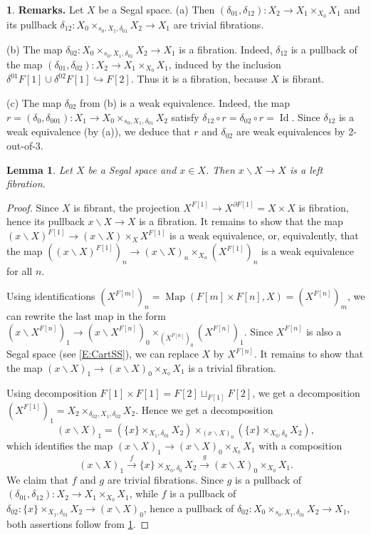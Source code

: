 \documentclass[12pt]{amsart}
\theoremstyle{plain}
\newtheorem{Lem}[Thm]{Lemma}
\theoremstyle{definition}
\newtheorem{Emp}[Thm]{}
\numberwithin{equation}{section}
\newcommand{\lra}{\longrightarrow}
\newcommand{\hra}{\hookrightarrow}
\newcommand{\dt}{\delta}
\newcommand{\bs}{\backslash}
\newcommand{\re}[1]{\ref{E:#1}}
\newcommand{\Map}{\operatorname{Map}}
\newcommand{\p}{\partial}
\newcommand{\Id}{\operatorname{Id}}
\begin{document}
\begin{Emp} \label{E:remss}
{\bf Remarks.} Let $X$ be a Segal space. (a) Then
$(\dt_{01},\dt_{12}):X_2\to X_1\times_{X_0}X_1$ and its pullback
$\dt_{12}:X_0\times_{s_0,X_1,\dt_{01}}X_2\to X_1$ are trivial
fibrations.

(b) The map $\dt_{02}:X_0\times_{s_0,X_1,\dt_{01}}X_2\to X_1$ is a
fibration. Indeed, $\dt_{12}$ is a pullback of the map
$(\dt_{01},\dt_{02}):X_2\to X_1\times_{X_0}X_1$, induced by the
inclusion $\dt^{01}F[1]\cup\dt^{02}F[1]\hra F[2]$. Thus it is a
fibration, because $X$ is fibrant.

(c) The map $\dt_{02}$ from (b) is a weak equivalence. Indeed, the
map $r=(\dt_0,\dt_{001}):X_1\to X_0\times_{s_0,X_1,\dt_{01}}X_2$
satisfy $\dt_{12}\circ r=\dt_{02}\circ r=\Id$. Since $\dt_{12}$ is
a weak equivalence (by (a)), we deduce that $r$ and $\dt_{02}$ are
weak equivalences by 2-out-of-3.
\end{Emp}



\begin{Lem} \label{L:undcat}
Let $X$ be a Segal space and $x\in X$. Then $x\bs X\to X$ is a
left fibration.
\end{Lem}

\begin{proof}
Since $X$ is fibrant, the projection $X^{F[1]}\to X^{\p
F[1]}=X\times X$ is fibration, hence its pullback $x\bs X\to X$ is
a fibration. It remains to show that the map $(x\bs X)^{F[1]}\to
(x\bs X)\times_X X^{F[1]}$ is a weak equivalence, or,
equivalently, that the map
 $((x\bs X)^{F[1]})_n\to
(x\bs X)_n\times_{X_n} (X^{F[1]})_n$ is a weak equivalence for all
$n$.

Using identifications $(X^{F[m]})_n=\Map(F[m]\times
F[n],X)=(X^{F[n]})_m$, we can rewrite the last map in the form
$(x\bs X^{F[n]})_1\to (x\bs X^{F[n]})_0\times_{(X^{F[n]})_0}
(X^{F[n]})_1$. Since $X^{F[n]}$ is also a Segal space (see
\re{CartSS}), we can replace $X$ by $X^{F[n]}$. It remains to show
that the map $(x\bs X)_1\to(x\bs X)_0\times_{X_0} X_1$ is a
trivial fibration.

Using decomposition $F[1]\times F[1]=F[2]\sqcup_{F[1]} F[2]$, we
get a decomposition
$(X^{F[1]})_1=X_2\times_{\dt_{02},X_1,\dt_{02}}X_2$. Hence we get
a decomposition
%
\begin{equation} \label{Eq:decomp}
(x\bs X)_1=(\{x\}\times_{X_1,\dt_{01}}X_2)\times_{(x\bs
X)_0}(\{x\}\times_{X_0,\dt_0}X_2),
\end{equation}
%
which identifies the map $(x\bs X)_1\to(x\bs X)_0\times_{X_0} X_1$
with a composition
\[
(x\bs
X)_1\overset{f}{\lra}\{x\}\times_{X_0,\dt_0}X_2\overset{g}{\lra}(x\bs
X)_0\times_{X_0} X_1.
\]
We claim that $f$ and $g$ are trivial fibrations. Since
$g$ is a pullback of $(\dt_{01},\dt_{12}):X_2\to
X_1\times_{X_0}X_1$, while $f$ is a pullback of
$\dt_{02}:\{x\}\times_{X_1,\dt_{01}}X_2\to(x\bs X)_0$, hence a
pullback of $\dt_{02}:X_0\times_{s_0,X_1,\dt_{01}}X_2\to X_1$,
both assertions follow from \re{remss}.
\end{proof}
\end{document}

